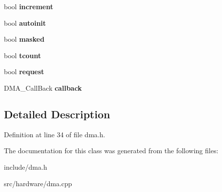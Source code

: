 \begin{DoxyCompactItemize}
\item 
\hypertarget{classDmaChannel_a462fde087b93bc0172eae96bfac4cb78}{bool {\bfseries increment}}\label{classDmaChannel_a462fde087b93bc0172eae96bfac4cb78}

\item 
\hypertarget{classDmaChannel_ad70005267377fb3829595928fc400f9a}{bool {\bfseries autoinit}}\label{classDmaChannel_ad70005267377fb3829595928fc400f9a}

\item 
\hypertarget{classDmaChannel_ad24be4e9ff88231234910ea3ee1eec2d}{bool {\bfseries masked}}\label{classDmaChannel_ad24be4e9ff88231234910ea3ee1eec2d}

\item 
\hypertarget{classDmaChannel_a2e4fad930477a7c01aa3fa99ab621cb9}{bool {\bfseries tcount}}\label{classDmaChannel_a2e4fad930477a7c01aa3fa99ab621cb9}

\item 
\hypertarget{classDmaChannel_a5c77231af669e0e07bbfe6312c19bcd5}{bool {\bfseries request}}\label{classDmaChannel_a5c77231af669e0e07bbfe6312c19bcd5}

\item 
\hypertarget{classDmaChannel_a41e670fcadb263b920f0a4bd86c044b2}{D\-M\-A\-\_\-\-Call\-Back {\bfseries callback}}\label{classDmaChannel_a41e670fcadb263b920f0a4bd86c044b2}

\end{DoxyCompactItemize}


\subsection{Detailed Description}


Definition at line 34 of file dma.\-h.



The documentation for this class was generated from the following files\-:\begin{DoxyCompactItemize}
\item 
include/dma.\-h\item 
src/hardware/dma.\-cpp\end{DoxyCompactItemize}
